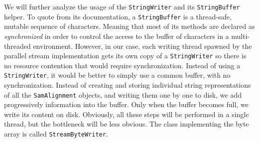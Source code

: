 \documentclass[a4paper,twoside]{article}
\begin{document}
We will further analyze the usage of the \texttt{StringWriter} and its \texttt{StringBuffer} helper.
To quote from its documentation, a {\texttt{StringBuffer}} is  a thread-safe, mutable sequence of characters.
Meaning that most of its methods are declared as {\textit{synchronized}} in order to control the access to the buffer of characters in a multi-threaded environment.
However, in our case, each writing thread spawned by the parallel stream implementation gets its own copy of a {\texttt{StringWriter}} so there is no resource contention that would require synchronization.
Instead of using a {\texttt{StringWriter}}, it would be better to simply use a common buffer, with no synchronization.
Instead of creating and storing individual string representations of all the {\texttt{SamAlignment}} objects, and writing them one by one to disk, we add progressively information into the buffer.
Only when the buffer becomes full, we write its content on disk.
Obviously, all these steps will be performed in a single thread, but the bottleneck will be less obvious.
The class implementing the byte array is called {\texttt{StreamByteWriter}}.
\end{document}
